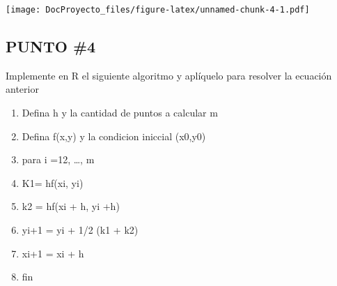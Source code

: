 \documentclass[]{article}
\newenvironment{Shaded}{\begin{snugshade}}{\end{snugshade}}
\newcommand{\KeywordTok}[1]{\textcolor[rgb]{0.13,0.29,0.53}{\textbf{#1}}}
\newcommand{\DataTypeTok}[1]{\textcolor[rgb]{0.13,0.29,0.53}{#1}}
\newcommand{\DecValTok}[1]{\textcolor[rgb]{0.00,0.00,0.81}{#1}}
\newcommand{\FloatTok}[1]{\textcolor[rgb]{0.00,0.00,0.81}{#1}}
\newcommand{\StringTok}[1]{\textcolor[rgb]{0.31,0.60,0.02}{#1}}
\newcommand{\ControlFlowTok}[1]{\textcolor[rgb]{0.13,0.29,0.53}{\textbf{#1}}}
\newcommand{\OperatorTok}[1]{\textcolor[rgb]{0.81,0.36,0.00}{\textbf{#1}}}
\newcommand{\NormalTok}[1]{#1}
\providecommand{\tightlist}{%
  \setlength{\itemsep}{0pt}\setlength{\parskip}{0pt}}
\begin{document}
\begin{Shaded}
\end{Shaded}

\texttt{[image: DocProyecto\_files/figure-latex/unnamed-chunk-4-1.pdf]}

\subsection{PUNTO \#4}\label{punto-4}

Implemente en R el siguiente algoritmo y aplíquelo para resolver la
ecuación anterior

\begin{enumerate}
\def\labelenumi{\arabic{enumi})}
\tightlist
\item
  Defina h y la cantidad de puntos a calcular m
\item
  Defina f(x,y) y la condicion iniccial (x0,y0)
\item
  para i =12, \ldots{}, m
\item
  K1= hf(xi, yi)
\item
  k2 = hf(xi + h, yi +h)
\item
  yi+1 = yi + 1/2 (k1 + k2)
\item
  xi+1 = xi + h
\item
  fin
\end{enumerate}
\end{document}
